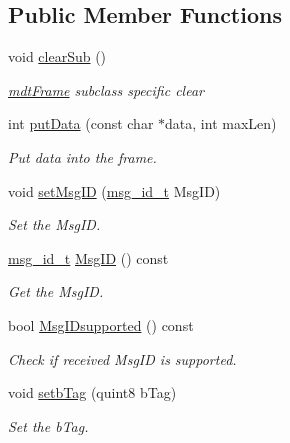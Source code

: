 \subsection*{Public Member Functions}
\begin{DoxyCompactItemize}
\item 
\hypertarget{classmdt_frame_usb_tmc_afb0b0e071e328b55ce8e2c73359153d6}{
void \hyperlink{classmdt_frame_usb_tmc_afb0b0e071e328b55ce8e2c73359153d6}{clearSub} ()}
\label{classmdt_frame_usb_tmc_afb0b0e071e328b55ce8e2c73359153d6}

\begin{DoxyCompactList}\small\item\em \hyperlink{classmdt_frame}{mdtFrame} subclass specific clear \end{DoxyCompactList}\item 
int \hyperlink{classmdt_frame_usb_tmc_a06d2743a113bd2b4cf2ee44014ecd710}{putData} (const char $\ast$data, int maxLen)
\begin{DoxyCompactList}\small\item\em Put data into the frame. \end{DoxyCompactList}\item 
void \hyperlink{classmdt_frame_usb_tmc_a19121b03cbb4c1bb420dc3cdb132f703}{setMsgID} (\hyperlink{classmdt_frame_usb_tmc_a10c2216157b0616b69f6cabc5c8e253b}{msg\_\-id\_\-t} MsgID)
\begin{DoxyCompactList}\small\item\em Set the MsgID. \end{DoxyCompactList}\item 
\hyperlink{classmdt_frame_usb_tmc_a10c2216157b0616b69f6cabc5c8e253b}{msg\_\-id\_\-t} \hyperlink{classmdt_frame_usb_tmc_a384a13bd456e6827868a17810d628a4a}{MsgID} () const 
\begin{DoxyCompactList}\small\item\em Get the MsgID. \end{DoxyCompactList}\item 
bool \hyperlink{classmdt_frame_usb_tmc_a80c01d9585674bed605ef4b8de4df74c}{MsgIDsupported} () const 
\begin{DoxyCompactList}\small\item\em Check if received MsgID is supported. \end{DoxyCompactList}\item 
void \hyperlink{classmdt_frame_usb_tmc_aff7b19ad83013402dd115089d31b8642}{setbTag} (quint8 bTag)
\begin{DoxyCompactList}\small\item\em Set the bTag. \end{DoxyCompactList}\item 

\end{DoxyCompactItemize}
